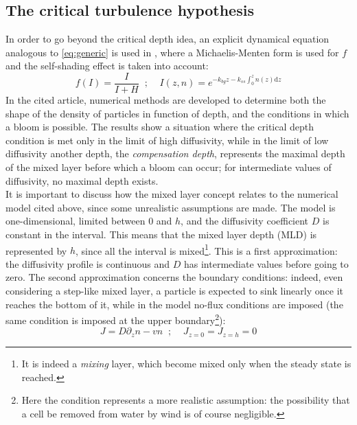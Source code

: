\subsection{The critical turbulence hypothesis} \label{sec:ref_crit_turb}
In order to go beyond the critical depth idea, an explicit dynamical equation analogous to \autoref{eq:generic} is used in \autocite{Huisman2002HowPersist}, where a Michaelis-Menten form is used for $f$ and the self-shading effect is taken into account:
\[ f(I) = \frac{I}{I+H} \;\;;\;\;\;\; I(z,n) = e^{-k_{bg}z-k_{ss}\int_0^zn(z)\mathrm{d}z}\]
In the cited article, numerical methods are developed to determine both the shape of the density of particles in function of depth, and the conditions in which a bloom is possible. The results show a situation where the critical depth condition is met only in the limit of high diffusivity, while in the limit of low diffusivity another depth, the \textit{compensation depth}, represents the maximal depth of the mixed layer before which a bloom can occur; for intermediate values of diffusivity, no maximal depth exists. \\
It is important to discuss how the mixed layer concept relates to the numerical model cited above, since some unrealistic assumptions are made. The model is one-dimensional, limited between $0$ and $h$, and the diffusivity coefficient $D$ is constant in the interval. This means that the mixed layer depth (MLD) is represented by $h$, since all the interval is mixed\footnote{It is indeed a \textit{mixing} layer, which become mixed only when the steady state is reached.}. This is a first approximation: the diffusivity profile is continuous and $D$ has intermediate values before going to zero. The second approximation concerns the boundary conditions: indeed, even considering a step-like mixed layer, a particle is expected to sink linearly once it reaches the bottom of it, while in the model no-flux conditions are imposed (the same condition is imposed at the upper boundary\footnote{Here the condition represents a more realistic assumption: the possibility that a cell be removed from water by wind is of course negligible.}):
\[ J=D\partial_z n - v n \;\; ; \;\;\;\; J_{z=0} = J_{z=h} = 0\]

